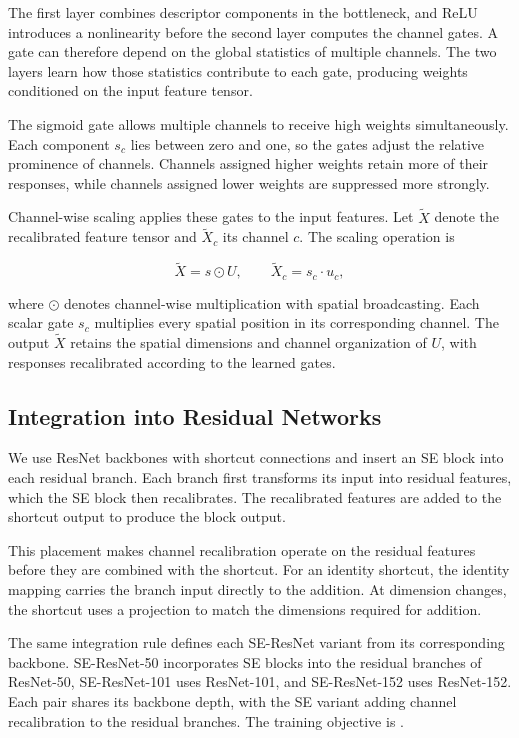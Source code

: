 The first layer combines descriptor components in the bottleneck, and ReLU introduces a nonlinearity before the second layer computes the channel gates. A gate can therefore depend on the global statistics of multiple channels. The two layers learn how those statistics contribute to each gate, producing weights conditioned on the input feature tensor.

The sigmoid gate allows multiple channels to receive high weights simultaneously. Each component $s_c$ lies between zero and one, so the gates adjust the relative prominence of channels. Channels assigned higher weights retain more of their responses, while channels assigned lower weights are suppressed more strongly.

Channel-wise scaling applies these gates to the input features. Let $\widetilde X$ denote the recalibrated feature tensor and $\widetilde X_c$ its channel $c$. The scaling operation is

\[
\widetilde X=s\odot U,
\qquad
\widetilde X_c=s_c\cdot u_c,
\]

where $\odot$ denotes channel-wise multiplication with spatial broadcasting. Each scalar gate $s_c$ multiplies every spatial position in its corresponding channel. The output $\widetilde X$ retains the spatial dimensions and channel organization of $U$, with responses recalibrated according to the learned gates.

\subsection{Integration into Residual Networks}

We use ResNet backbones with shortcut connections \cite{he2016resnet} and insert an SE block into each residual branch. Each branch first transforms its input into residual features, which the SE block then recalibrates. The recalibrated features are added to the shortcut output to produce the block output.

This placement makes channel recalibration operate on the residual features before they are combined with the shortcut. For an identity shortcut, the identity mapping carries the branch input directly to the addition. At dimension changes, the shortcut uses a projection to match the dimensions required for addition.

The same integration rule defines each SE-ResNet variant from its corresponding backbone. SE-ResNet-50 incorporates SE blocks into the residual branches of ResNet-50, SE-ResNet-101 uses ResNet-101, and SE-ResNet-152 uses ResNet-152. Each pair shares its backbone depth, with the SE variant adding channel recalibration to the residual branches. The training objective is .
